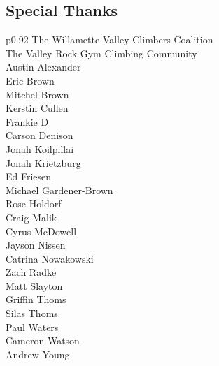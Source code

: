 \begin{flushleft}
\section{Special Thanks}
\begin{center}
\begin{supertabular}{p{0.92\linewidth}}
The Willamette Valley Climbers Coalition\\
The Valley Rock Gym Climbing Community\\
Austin Alexander\\
Eric Brown\\
Mitchel Brown\\
Kerstin Cullen\\
Frankie D\\
Carson Denison\\
Jonah Koilpillai\\
Jonah Krietzburg\\
Ed Friesen\\
Michael Gardener-Brown\\
Rose Holdorf\\
Craig Malik\\
Cyrus McDowell\\
Jayson Nissen\\
Catrina Nowakowski\\
Zach Radke\\
Matt Slayton\\
Griffin Thoms\\
Silas Thoms\\
Paul Waters\\
Cameron Watson\\
Andrew Young\\
\end{supertabular}
\end{center}
\end{flushleft}
\onecolumn
\clearpage